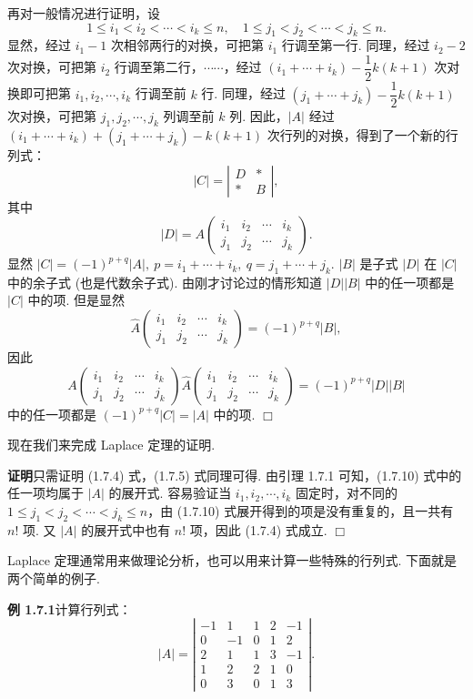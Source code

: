 \documentclass[UTF8, 12pt, fontset=fandol, oneside]{ctexart}
\begin{document}
再对一般情况进行证明，设
\[
1\le i_1<i_2<\cdots<i_k\le n,\quad 1\le j_1<j_2<\cdots<j_k\le n.
\]
显然，经过 $i_1-1$ 次相邻两行的对换，可把第 $i_1$ 行调至第一行. 同理，经过 $i_2-2$ 次对换，可把第 $i_2$ 行调至第二行，$\cdots\cdots$，经过 $(i_1+\cdots+i_k)-\dfrac{1}{2}k(k+1)$ 次对换即可把第 $i_1,i_2,\cdots,i_k$ 行调至前 $k$ 行. 同理，经过 $(j_1+\cdots+j_k)-\dfrac{1}{2}k(k+1)$ 次对换，可把第 $j_1,j_2,\cdots,j_k$ 列调至前 $k$ 列. 因此，$|A|$ 经过 $(i_1+\cdots+i_k)+(j_1+\cdots+j_k)-k(k+1)$ 次行列的对换，得到了一个新的行列式：
\[
|C|=\left|\begin{array}{cc}
D&*\\
*&B
\end{array}\right|,
\]
其中
\[
|D|=A\left(\begin{array}{cccc}
i_1&i_2&\cdots&i_k\\
j_1&j_2&\cdots&j_k
\end{array}\right).
\]
显然 $|C|=(-1)^{p+q}|A|,\ p=i_1+\cdots+i_k,\ q=j_1+\cdots+j_k$. $|B|$ 是子式 $|D|$ 在 $|C|$ 中的余子式 (也是代数余子式). 由刚才讨论过的情形知道 $|D||B|$ 中的任一项都是 $|C|$ 中的项. 但是显然
\[
\widehat{A}\left(\begin{array}{cccc}
i_1&i_2&\cdots&i_k\\
j_1&j_2&\cdots&j_k
\end{array}\right)=(-1)^{p+q}|B|,
\]
因此
\begin{equation}
A\left(\begin{array}{cccc}
i_1&i_2&\cdots&i_k\\
j_1&j_2&\cdots&j_k
\end{array}\right)
\widehat{A}\left(\begin{array}{cccc}
i_1&i_2&\cdots&i_k\\
j_1&j_2&\cdots&j_k
\end{array}\right)
=(-1)^{p+q}|D||B|
\tag{1.7.10}
\end{equation}
中的任一项都是 $(-1)^{p+q}|C|=|A|$ 中的项. $\Box$

现在我们来完成 Laplace 定理的证明.

\noindent\textbf{证明}\quad 只需证明 (1.7.4) 式，(1.7.5) 式同理可得. 由引理 1.7.1 可知，(1.7.10) 式中的任一项均属于 $|A|$ 的展开式. 容易验证当 $i_1,i_2,\cdots,i_k$ 固定时，对不同的 $1\le j_1<j_2<\cdots<j_k\le n$，由 (1.7.10) 式展开得到的项是没有重复的，且一共有 $n!$ 项. 又 $|A|$ 的展开式中也有 $n!$ 项，因此 (1.7.4) 式成立. $\Box$

Laplace 定理通常用来做理论分析，也可以用来计算一些特殊的行列式. 下面就是两个简单的例子.

\noindent\textbf{例 1.7.1}\quad 计算行列式：
\[
|A|=
\left|\begin{array}{rrrrr}
-1&1&1&2&-1\\
0&-1&0&1&2\\
2&1&1&3&-1\\
1&2&2&1&0\\
0&3&0&1&3
\end{array}\right|.
\]
\end{document}
